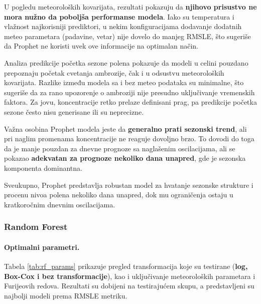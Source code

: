 \documentclass[12pt]{article}
\begin{document}
U pogledu meteoroloških kovarijata, rezultati pokazuju da \textbf{njihovo prisustvo ne mora nužno da poboljša performanse modela}. Iako su temperatura i vlažnost najkorisniji prediktori, u nekim konfiguracijama dodavanje dodatnih meteo parametara (padavine, vetar) nije dovelo do manjeg RMSLE, što sugeriše da Prophet ne koristi uvek ove informacije na optimalan način.  

Analiza predikcije početka sezone polena pokazuje da modeli u celini pouzdano prepoznaju početak cvetanja ambrozije, čak i u odsustvu meteoroloških kovarijata. Razlike između modela sa i bez meteo podataka su minimalne, što sugeriše da za rano upozorenje o ambroziji nije presudno uključivanje vremenskih faktora. Za jovu, koncentracije retko prelaze definisani prag, pa predikcije početka sezone često nisu generisane ili su neprecizne.  

Važna osobina Prophet modela jeste da \textbf{generalno prati sezonski trend}, ali pri naglim promenama koncentracije ne reaguje dovoljno brzo. To dovodi do toga da je manje pouzdan za dnevne prognoze sa naglašenim oscilacijama, ali se pokazao \textbf{adekvatan za prognoze nekoliko dana unapred}, gde je sezonska komponenta dominantna.  

Sveukupno, Prophet predstavlja robustan model za hvatanje sezonske strukture i procenu nivoa polena nekoliko dana unapred, dok mu ograničenja ostaju u kratkoročnim dnevnim oscilacijama.




\subsubsection{Random Forest}

\paragraph{\textbf{Optimalni parametri.}}
Tabela \ref{tab:rf_params} prikazuje pregled transformacija koje su testirane (\textbf{log, Box-Cox i bez transformacije}), kao i uključivanje meteoroloških parametara i Furijeovih redova. Rezultati su dobijeni na testirajućem skupu, a predstavljeni su najbolji modeli prema RMSLE metriku.
\end{document}
